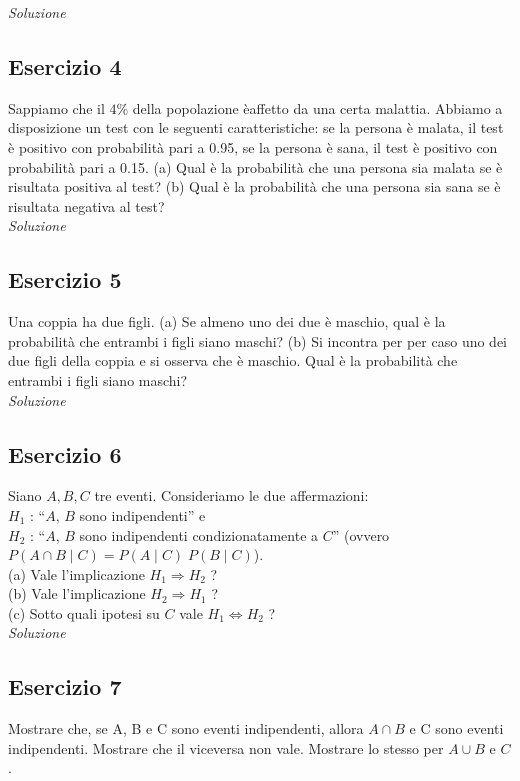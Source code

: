 \textit{Soluzione} \quad

\subsection{Esercizio 4}
Sappiamo che il $4\%$ della popolazione èaffetto da una certa malattia. Abbiamo a disposizione un test con le seguenti caratteristiche: se la persona è malata, il test è positivo con probabilità pari a 0.95, se la persona è sana, il test è positivo con probabilità pari a 0.15.
(a) Qual è la probabilità che una persona sia malata se è risultata positiva al test? (b) Qual è la probabilità che una persona sia sana se è risultata negativa al test?
\\

\textit{Soluzione} \quad

\subsection{Esercizio 5} 
Una coppia ha due figli.
(a) Se almeno uno dei due è maschio, qual è la probabilità che entrambi i figli siano maschi? (b) Si incontra per per caso uno dei due figli della coppia e si osserva che è maschio. Qual è la probabilità che entrambi i figli siano maschi?
\\

\textit{Soluzione} \quad
\subsection{Esercizio 6} 
Siano $A, B, C$ tre eventi. Consideriamo le due affermazioni: \\
$H_1$ : “$A$, $B$ sono indipendenti” e \\
$H_2$ : “$A$, $B$ sono indipendenti condizionatamente a $C$” (ovvero $P (A\cap B\mid C) = P (A\mid C)\;P (B\mid C)$). \\
(a) Vale l’implicazione $H_1 \Rightarrow H_2$ ? \\ 
(b) Vale l’implicazione $H_2 \Rightarrow H_1$ ? \\
(c) Sotto quali ipotesi su $C$ vale $H_1 \iff H_2$ ?
\\

\textit{Soluzione} \quad
\subsection{Esercizio 7} 
Mostrare che, se A, B e C sono eventi indipendenti, allora $A \cap  B$ e C sono eventi indipendenti. Mostrare che il viceversa non vale. Mostrare lo stesso per $A \cup B$ e $C$.
\\

